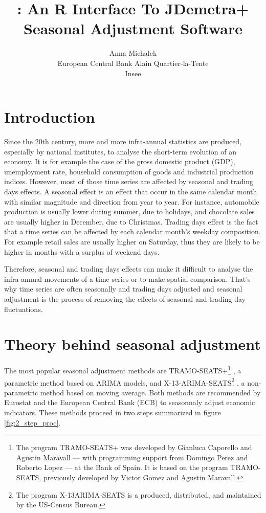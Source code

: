 \documentclass[article]{jss}
\author{
Anna Michalek\\European Central Bank \And Alain Quartier-la-Tente\\Insee
}
\title{\pkg{RJDemetra}: An R Interface To JDemetra+ Seasonal Adjustment
Software}
\begin{document}
\hypertarget{introduction}{%
\section{Introduction}\label{introduction}}

Since the 20th century, more and more infra-annual statistics are
produced, especially by national institutes, to analyse the short-term
evolution of an economy. It is for example the case of the gross
domestic product (GDP), unemployment rate, household consumption of
goods and industrial production indices. However, most of those time
series are affected by seasonal and trading days effects. A seasonal
effect is an effect that occur in the same calendar month with similar
magnitude and direction from year to year. For instance, automobile
production is usually lower during summer, due to holidays, and
chocolate sales are usually higher in December, due to Christmas.
Trading days effect is the fact that a time series can be affected by
each calendar month's weekday composition. For example retail sales are
usually higher on Saturday, thus they are likely to be higher in months
with a surplus of weekend days.

Therefore, seasonal and trading days effects can make it difficult to
analyse the infra-annual movements of a time series or to make spatial
comparison. That's why time series are often seasonally and trading days
adjusted and seasonal adjustment is the process of removing the effects
of seasonal and trading day fluctuations.

\hypertarget{theory-behind-seasonal-adjustment}{%
\section{Theory behind seasonal
adjustment}\label{theory-behind-seasonal-adjustment}}

The most popular seasonal adjustment methods are TRAMO-SEATS+\footnote{The
  program TRAMO-SEATS+ was developed by Gianluca Caporello and Agustin
  Maravall --- with programming support from Domingo Perez and Roberto
  Lopez --- at the Bank of Spain. It is based on the program
  TRAMO-SEATS, previously developed by Victor Gomez and Agustin
  Maravall.} \citep{gomez1996programs, caporello2004program}, a
parametric method based on ARIMA models, and X-13-ARIMA-SEATS\footnote{The
  program X-13ARIMA-SEATS is a produced, distributed, and maintained by
  the US-Census Bureau.} \citep{findleyx12, ladiray1999x11en}, a
non-parametric method based on moving average. Both methods are
recommended by Eurostat and the European Central Bank (ECB) to
seasonnaly adjust economic indicators. These methods proceed in two
steps summarized in figure \ref{fig:2_step_proc}.
\end{document}
